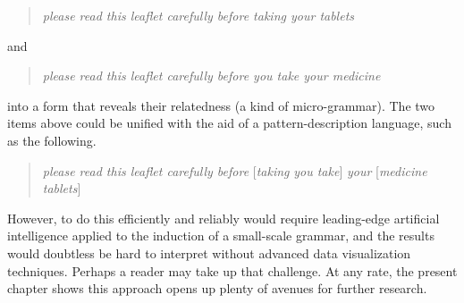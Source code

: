 \documentclass[output=paper]{langscibook}
\begin{document}
\begin{quote}
\textit{please read this leaflet carefully before taking your tablets}
\end{quote}
and

\begin{quote}
\textit{please read this leaflet carefully before you take your medicine}
\end{quote}
into a form that reveals their relatedness (a kind of micro-grammar). The two items above could be unified with the aid of a pattern-description language, such as the following.

\begin{quote}
\textit{please read this leaflet carefully before} [\textit{taking} {\textbar} \textit{you take}] \textit{your} [\textit{medicine} {\textbar} \textit{tablets}]
\end{quote}

However, to do this efficiently and reliably would require leading-edge artificial intelligence applied to the induction of a small-scale grammar, and the results would doubtless be hard to interpret without advanced data visualization techniques. Perhaps a reader may take up that challenge. At any rate, the present chapter shows this approach opens up plenty of avenues for further research.

\largerpage
{\sloppy\printbibliography[heading=subbibliography,notkeyword=this]}
\end{document}
